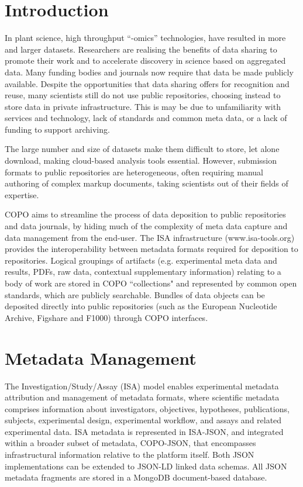 \documentclass[runningheads,a4paper]{llncs}
\begin{document}
\section{Introduction}
In plant science, high
throughput “-omics” technologies, have resulted in more and larger
datasets. Researchers are realising the benefits of
data sharing to promote their work and to accelerate discovery in
science based on aggregated data. Many funding bodies and journals now
require that data be made publicly available. Despite the
opportunities that data sharing offers for recognition and reuse, many
scientists still do not use public repositories, choosing instead to
store data in private infrastructure. This is may be due to unfamiliarity with services and technology, lack of standards and common meta data, or a lack of funding to
support archiving.

The large number and size of datasets make them difficult to
store, let alone download, making cloud-based analysis tools essential. However, submission formats to public repositories are
heterogeneous, often requiring manual authoring of complex markup
documents, taking scientists out of their fields of expertise.

COPO aims to streamline the process of data deposition to public
repositories and data journals, by hiding much of the complexity of
meta data capture and data management from the end-user. The ISA
infrastructure (www.isa-tools.org) provides the
interoperability between metadata formats required for deposition to repositories.  Logical groupings of artifacts (e.g. experimental meta data
and results, PDFs, raw data, contextual supplementary information)
relating to a body of work are stored in COPO “collections" and
represented by common open standards, which are publicly
searchable. Bundles of data objects can be
deposited directly into public repositories (such as the European Nucleotide Archive, Figshare and F1000) through COPO interfaces.


\vspace*{-0.3in}
\section{Metadata Management}
The Investigation/Study/Assay (ISA) model enables experimental
metadata attribution and management of metadata formats, where
scientific metadata comprises information about investigators,
objectives, hypotheses, publications, subjects, experimental design,
experimental workflow, and assays and related experimental data. ISA
metadata is represented in ISA-JSON, and integrated within a broader
subset of metadata, COPO-JSON, that encompasses infrastructural
information relative to the platform itself. Both JSON implementations
can be extended to JSON-LD linked data schemas. All JSON metadata
fragments are stored in a MongoDB document-based database.
\end{document}
